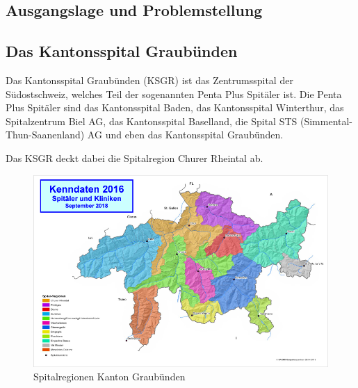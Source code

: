 
\begin{flushleft}
    \section{Ausgangslage und Problemstellung}
    \subsection{Das Kantonsspital Graubünden}
    Das Kantonsspital Graubünden (KSGR) ist das Zentrumsspital der Südostschweiz, welches Teil der sogenannten Penta Plus Spitäler ist.
    Die Penta Plus Spitäler sind das Kantonsspital Baden, das Kantonsspital Winterthur, das Spitalzentrum Biel AG, das Kantonsspital Baselland, die Spital STS (Simmental-Thun-Saanenland) AG und eben das Kantonsspital Graubünden.
\end{flushleft}
\begin{flushleft}
    Das KSGR deckt dabei die Spitalregion Churer Rheintal ab.
    \begin{figure}[H]
        \centering
        \includegraphics[width=1\linewidth]{source/introduction/initial_situation/gr_spitalregionen}
        \caption{Spitalregionen Kanton Graubünden\cite{ER2J77MB}}
        \label{fig:gr_spitalregionen}
    \end{figure}
\end{flushleft}
